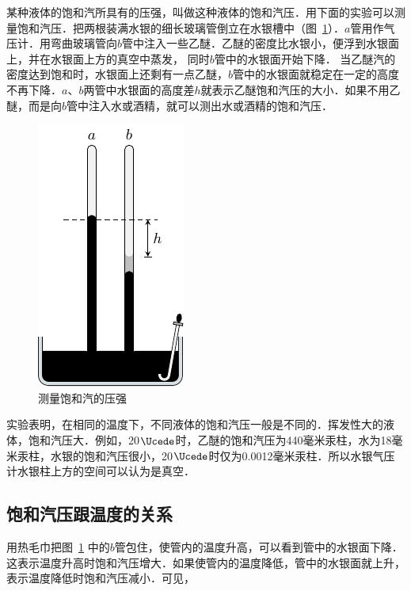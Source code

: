 某种液体的饱和汽所具有的压强，叫做这种液体的饱和汽压．用下面的实验可以测量饱和汽压．把两根装满水银的细长玻璃管倒立在水银槽中（图~\ref{fig_B_5-3}）．$a$管用作气压计．用弯曲玻璃管向$b$管中注入一些乙醚．乙醚的密度比水银小，便浮到水银面上，并在水银面上方的真空中蒸发，
同时$b$管中的水银面开始下降．
当乙醚汽的密度达到饱和时，水银面上还剩有一点乙醚，$b$管中的水银面就稳定在一定的高度不再下降．$a$、$b$两管中水银面的高度差$h$就表示乙醚饱和汽压的大小．如果不用乙醚，而是向$b$管中注入水或酒精，就可以测出水或酒精的饱和汽压．
\begin{figure}[htbp]
  \centering
  \includegraphics{fig/B/5-3.pdf}
  \caption{测量饱和汽的压强}\label{fig_B_5-3}
\end{figure}

实验表明，在相同的温度下，不同液体的饱和汽压一般是不同的．挥发性大的液体，饱和汽压大．例如，20$\Ucede$时，乙醚的饱和汽压为440毫米汞柱，水为18毫米汞柱，水银的饱和汽压很小，20$\Ucede$时仅为0.0012毫米汞柱．所以水银气压计水银柱上方的空间可以认为是真空．

\subsection{饱和汽压跟温度的关系} 

用热毛巾把图~\ref{fig_B_5-3} 中的$b$管包住，使管内的温度升高，可以看到管中的水银面下降．这表示温度升高时饱和汽压增大．如果使管内的温度降低，管中的水银面就上升，表示温度降低时饱和汽压减小．可见，

